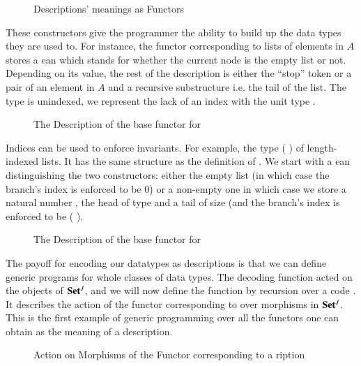 \begin{figure}[h]
\caption{Descriptions' meanings as Functors\label{fig:datadescmeaning}}
\end{figure}

These constructors give the programmer the ability to build up the data
types they are used to. For instance, the functor corresponding
to lists of elements in $A$ stores a ean which stands for whether
the current node is the empty list or not. Depending on its value, the
rest of the description is either the ``stop'' token or a pair of an element
in $A$ and a recursive substructure i.e. the tail of the list. The  type
is unindexed, we represent the lack of an index with the unit type \AD{$\top$}.

\begin{figure}[h]
\caption{The Description of the base functor for  }\label{figure:listD}
\end{figure}

Indices can be used to enforce invariants. For example, the type ({  })
of length-indexed lists. It has the same structure as the definition of .
We start with a ean distinguishing the two constructors: either
the empty list (in which case the branch's index is enforced to be $0$) or a
non-empty one in which case we store a natural number , the head of type
 and a tail of size  (and the branch's index is enforced to be
( ).

\begin{figure}[h]
\caption{The Description of the base functor for   }\label{figure:vecD}
\end{figure}

The payoff for encoding our datatypes as descriptions is that we can define
generic programs for whole classes of data types. The decoding function 
acted on the objects of $\mathbf{Set}{}^J$, and we will now define the function  by
recursion over a code . It describes the action of the functor corresponding
to  over morphisms in $\mathbf{Set}{}^J$. This is the first example of generic
programming over all the functors one can obtain as the meaning of a description.

\begin{figure}[h]
\caption{Action on Morphisms of the Functor corresponding to a ription}
\end{figure}


